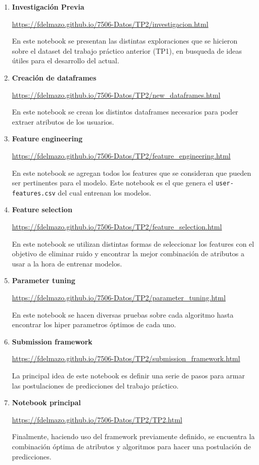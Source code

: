 \documentclass[a4paper]{article}
\begin{document}
\begin{enumerate} 
	\item \textbf{Investigación Previa}

	\small{\url{https://fdelmazo.github.io/7506-Datos/TP2/investigacion.html}}

	En este notebook se presentan las distintas exploraciones que se hicieron sobre el dataset del trabajo práctico anterior (TP1), en busqueda de ideas útiles para el desarrollo del actual.

	\item \textbf{Creación de dataframes}

	\small{\url{https://fdelmazo.github.io/7506-Datos/TP2/new_dataframes.html}}

	En este notebook se crean los distintos dataframes necesarios para poder extraer atributos de los usuarios.

	\item \textbf{Feature engineering}

	\small{\url{https://fdelmazo.github.io/7506-Datos/TP2/feature_engineering.html}}

	En este notebook se agregan todos los features que se consideran que pueden ser pertinentes para el modelo. Este notebook es el que genera el \texttt{user-features.csv} del cual entrenan los modelos.

	\item \textbf{Feature selection}

	\small{\url{https://fdelmazo.github.io/7506-Datos/TP2/feature_selection.html}}

	En este notebook se utilizan distintas formas de seleccionar los features con el objetivo de eliminar ruido y encontrar la mejor combinación de atributos a usar a la hora de entrenar modelos.

	\item \textbf{Parameter tuning}

	\small{\url{https://fdelmazo.github.io/7506-Datos/TP2/parameter_tuning.html}}

	En este notebook se hacen diversas pruebas sobre cada algoritmo hasta encontrar los hiper parametros óptimos de cada uno.

	\item \textbf{Submission framework}

	\small{\url{https://fdelmazo.github.io/7506-Datos/TP2/submission_framework.html}}

	La principal idea de este notebook es definir una serie de pasos para armar las postulaciones de predicciones del trabajo práctico.

	\item \textbf{Notebook principal}

	\small{\url{https://fdelmazo.github.io/7506-Datos/TP2/TP2.html}}

	Finalmente, haciendo uso del framework previamente definido, se encuentra la combinación óptima de atributos y algoritmos para hacer una postulación de predicciones.

\end{enumerate}
\end{document}

